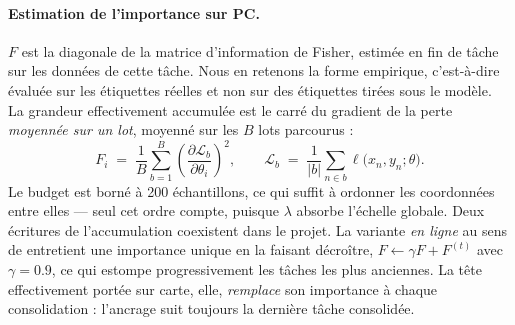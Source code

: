 \paragraph{Estimation de l'importance sur PC.} $F$ est la diagonale de la matrice d'information de
Fisher, estimée en fin de tâche sur les données de cette tâche. Nous en retenons la forme empirique,
c'est-à-dire évaluée sur les étiquettes réelles et non sur des étiquettes tirées sous le modèle. La
grandeur effectivement accumulée est le carré du gradient de la perte \emph{moyennée sur un lot},
moyenné sur les $B$ lots parcourus :
\begin{equation}
\label{eq:fisher}
F_i \;=\; \frac{1}{B} \sum_{b=1}^{B}
\left( \frac{\partial \mathcal{L}_b}{\partial \theta_i} \right)^{\!2},
\qquad
\mathcal{L}_b \;=\; \frac{1}{|b|} \sum_{n \in b} \ell\bigl(x_n, y_n; \theta\bigr) .
\end{equation}
Le budget est borné à \num{200} échantillons, ce qui suffit à ordonner les coordonnées entre elles ---
seul cet ordre compte, puisque $\lambda$ absorbe l'échelle globale. Deux écritures de l'accumulation
coexistent dans le projet. La variante \emph{en ligne} au sens de \cite{Schwarz2018Online} entretient
une importance unique en la faisant décroître, $F \leftarrow \gamma F + F^{(t)}$ avec $\gamma =
\num{0.9}$, ce qui estompe progressivement les tâches les plus anciennes. La tête effectivement
portée sur carte, elle, \emph{remplace} son importance à chaque consolidation : l'ancrage suit
toujours la dernière tâche consolidée.

